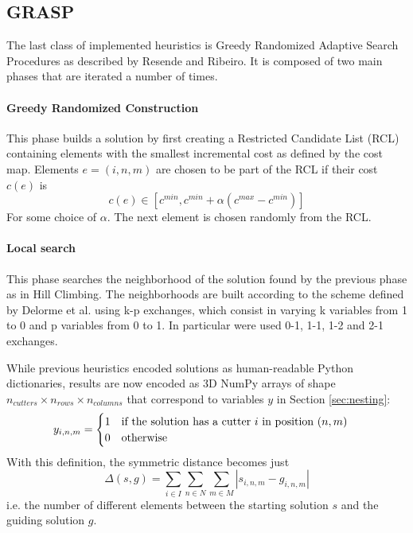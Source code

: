 \subsection{GRASP}
The last class of implemented heuristics is Greedy Randomized Adaptive Search Procedures as described by Resende and Ribeiro\cite{grasp}. It is composed of two main phases that are iterated a number of times.

\paragraph{Greedy Randomized Construction} This phase builds a solution by first creating a Restricted Candidate List (RCL) containing elements with the smallest incremental cost as defined by the cost map. Elements $e = (i, n, m)$ are chosen to be part of the RCL if their cost $c(e)$ is
$$
c(e) \in [c^{min}, c^{min} + \alpha (c^{max} - c^{min})]
$$ 
For some choice of $\alpha$. The next element is chosen randomly from the RCL.

\paragraph{Local search} This phase searches the neighborhood of the solution found by the previous phase as in Hill Climbing. The neighborhoods are built according to the scheme defined by Delorme et al.\cite{local_search} using k-p exchanges, which consist in varying k variables from 1 to 0 and p variables from 0 to 1. In particular were used 0-1, 1-1, 1-2 and 2-1 exchanges.

\vspace{20px}

While previous heuristics encoded solutions as human-readable Python dictionaries, results are now encoded as 3D NumPy arrays of shape $n_{cutters} \times n_{rows} \times n_{columns}$ that correspond to variables $y$ in Section \ref{sec:nesting}:
\begin{equation}\notag
	y_{i, n, m} = 
	\begin{cases}
		1 \quad \textrm{if the solution has a cutter } i \textrm{ in position } (n, m) \\
		0 \quad \textrm{otherwise}
	\end{cases}
\end{equation}
With this definition, the symmetric distance becomes just
$$
\Delta(s, g) = \sum_{i \in I}\sum_{n \in N}\sum_{m \in M} |s_{i, n, m} - g_{i, n, m}|
$$
i.e. the number of different elements between the starting solution $s$ and the guiding solution $g$.

